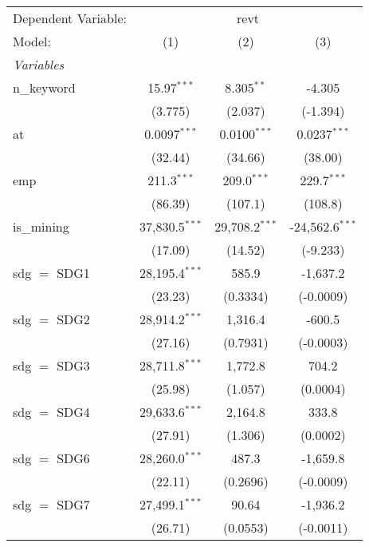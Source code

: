 
\begingroup
\centering
\begin{tabular}{lccc}
   \tabularnewline \midrule \midrule
   Dependent Variable: & \multicolumn{3}{c}{revt}\\
   Model:        & (1)              & (2)              & (3)\\  
   \midrule
   \emph{Variables}\\
   n\_keyword    & 15.97$^{***}$    & 8.305$^{**}$     & -4.305\\   
                 & (3.775)          & (2.037)          & (-1.394)\\   
   at            & 0.0097$^{***}$   & 0.0100$^{***}$   & 0.0237$^{***}$\\   
                 & (32.44)          & (34.66)          & (38.00)\\   
   emp           & 211.3$^{***}$    & 209.0$^{***}$    & 229.7$^{***}$\\   
                 & (86.39)          & (107.1)          & (108.8)\\   
   is\_mining    & 37,830.5$^{***}$ & 29,708.2$^{***}$ & -24,562.6$^{***}$\\   
                 & (17.09)          & (14.52)          & (-9.233)\\   
   sdg $=$ SDG1  & 28,195.4$^{***}$ & 585.9            & -1,637.2\\   
                 & (23.23)          & (0.3334)         & (-0.0009)\\   
   sdg $=$ SDG2  & 28,914.2$^{***}$ & 1,316.4          & -600.5\\   
                 & (27.16)          & (0.7931)         & (-0.0003)\\   
   sdg $=$ SDG3  & 28,711.8$^{***}$ & 1,772.8          & 704.2\\   
                 & (25.98)          & (1.057)          & (0.0004)\\   
   sdg $=$ SDG4  & 29,633.6$^{***}$ & 2,164.8          & 333.8\\   
                 & (27.91)          & (1.306)          & (0.0002)\\   
   sdg $=$ SDG6  & 28,260.0$^{***}$ & 487.3            & -1,659.8\\   
                 & (22.11)          & (0.2696)         & (-0.0009)\\   
   sdg $=$ SDG7  & 27,499.1$^{***}$ & 90.64            & -1,936.2\\   
                 & (26.71)          & (0.0553)         & (-0.0011)\\   

\end{tabular}
